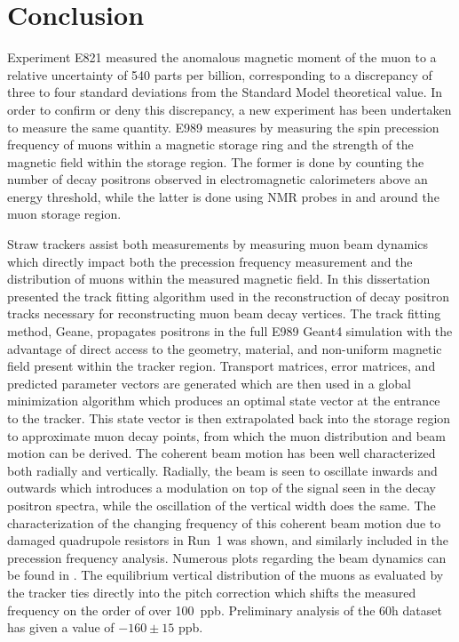 
\thispagestyle{myheadings} %

\chapter{Conclusion}
\label{chapter:Conclusion}


Experiment E821 measured the anomalous magnetic moment of the muon to a relative uncertainty of 540 parts per billion, corresponding to a discrepancy of three to four standard deviations from the Standard Model theoretical value. In order to confirm or deny this discrepancy, a new experiment has been undertaken to measure the same quantity. E989 measures \amu by measuring the spin precession frequency of muons within a magnetic storage ring and the strength of the magnetic field within the storage region. The former is done by counting the number of decay positrons observed in electromagnetic calorimeters above an energy threshold, while the latter is done using NMR probes in and around the muon storage region. 



Straw trackers assist both measurements by measuring muon beam dynamics which directly impact both the precession frequency measurement and the distribution of muons within the measured magnetic field. In  this dissertation presented the track fitting algorithm used in the reconstruction of decay positron tracks necessary for reconstructing muon beam decay vertices. The track fitting method, Geane, propagates positrons in the full E989 Geant4 simulation with the advantage of direct access to the geometry, material, and non-uniform magnetic field present within the tracker region. Transport matrices, error matrices, and predicted parameter vectors are generated which are then used in a global \chisq minimization algorithm which produces an optimal state vector at the entrance to the tracker. This state vector is then extrapolated back into the storage region to approximate muon decay points, from which the muon distribution and beam motion can be derived. The coherent beam motion has been well characterized both radially and vertically. Radially, the beam is seen to oscillate inwards and outwards which introduces a modulation on top of the \wa signal seen in the decay positron spectra, while the oscillation of the vertical width does the same. The characterization of the changing frequency of this coherent beam motion due to damaged quadrupole resistors in Run~1 was shown, and similarly included in the precession frequency analysis. Numerous plots regarding the beam dynamics can be found in . The equilibrium vertical distribution of the muons as evaluated by the tracker ties directly into the pitch correction which shifts the measured \wa frequency on the order of over \SI{100}{ppb}. Preliminary analysis of the 60h dataset has given a value of $-160 \pm 15$\xspace ppb.



